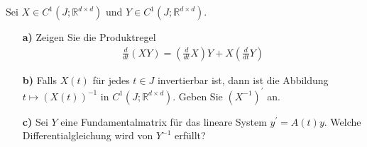 \begin{exercise}
Sei $X \in C^1(J;\mathbb{R}^{d \times d})$ und
$Y \in C^1(J;\mathbb{R}^{d \times d})$.
\begin{itemize}
  \item [\textbf{a)}] Zeigen Sie die Produktregel
  \begin{align*}
    \frac{d}{dt}(XY) = \left(\frac{d}{dt}X\right)Y + X\left(\frac{d}{dt}Y\right)
  \end{align*}
  \item [\textbf{b)}] Falls $X(t)$ für jedes $t \in J$ invertierbar ist, dann ist
  die Abbildung $t \mapsto (X(t))^{-1}$ in $C^1(J;\mathbb{R}^{d \times d})$.
  Geben Sie $(X^{-1})^{\prime}$ an.
  \item [\textbf{c)}] Sei $Y$ eine Fundamentalmatrix für das lineare System
  $y^{\prime} = A(t)y$. Welche Differentialgleichung wird von $Y^{-1}$ erfüllt?
\end{itemize}
\end{exercise}
